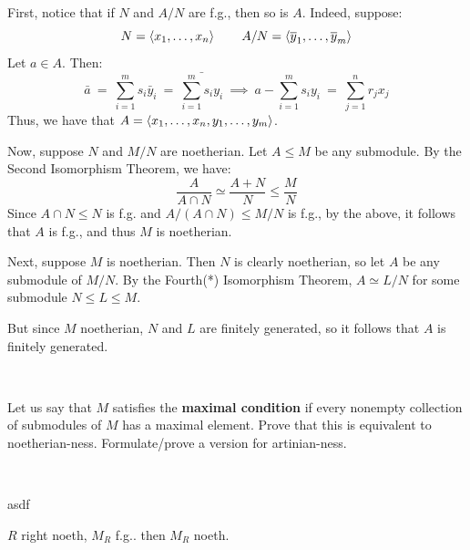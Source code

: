 \begin{pf}
	First, notice that if $N$ and $A/N$ are f.g., then so is $A$.
	Indeed, suppose:
	\begin{equation*}
	    N=\left\langle{x_{1},\dots,x_{n}}\right\rangle \qquad
		A/N=\left\langle{\overline{y}_{1},\dots,\overline{y}_{m}}\right\rangle
	\end{equation*}
	Let $a\in A$. Then:
	\begin{equation*}
	    \bar{a} \ = \ \sum_{i=1}^{m}s_{i}\bar{y}_{i} \ = \
		\bar{\sum_{i=1}^{m}s_{i}y_{i}} \ \implies \
		a - \sum_{i=1}^{m}s_{i}y_{i} \ = \ \sum_{j=1}^{n}r_{j}x_{j}
	\end{equation*}
	Thus, we have that $A=\left\langle{x_{1},\dots,x_{n},y_{1},\dots,y_{m}}\right\rangle$.

	Now, suppose $N$ and $M/N$ are noetherian.
	Let $A\leq M$ be any submodule.
	By the Second Isomorphism Theorem, we have:
	\begin{equation*}
		\frac{A}{A\cap N} \simeq \frac{A+N}{N} \leq \frac{M}{N}
	\end{equation*}
	Since $A\cap N \leq N$ is f.g. and $A/(A\cap N)\leq M/N$ is f.g.,
	by the above, it follows that $A$ is f.g., and thus $M$ is noetherian.

	Next, suppose $M$ is noetherian.
	Then $N$ is clearly noetherian, so let $A$ be any submodule of $M/N$.
	By the Fourth(*) Isomorphism Theorem, $A\simeq L/N$ for some submodule
	$N\leq L\leq M$.
	
	But since $M$ noetherian, $N$ and $L$ are finitely generated, so
	it follows that $A$ is finitely generated.
\end{pf} \

\begin{prop}[type=Exercise,num=1d)] %
	Let us say that $M$ satisfies the \textbf{maximal condition} if every
	nonempty collection of submodules of $M$ has a maximal element.
	Prove that this is equivalent to noetherian-ness.
	Formulate/prove a version for artinian-ness.
\end{prop} \

\begin{pf}
	asdf
\end{pf}

\nq
\begin{prop}[num=1.21(b)]
    $R$ right noeth, $M_{R}$ f.g.. then $M_{R}$ noeth.
\end{prop} \

